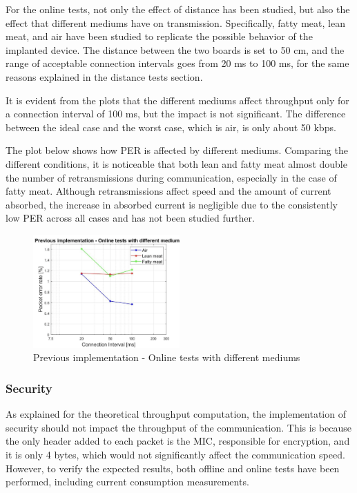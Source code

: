 \documentclass{Configuration_Files/PoliMi3i_thesis}
\begin{document}
For the online tests, not only the effect of distance has been studied, but also the effect that different mediums have on transmission. Specifically, fatty meat, lean meat, and air have been studied to replicate the possible behavior of the implanted device. The distance between the two boards is set to 50 cm, and the range of acceptable connection intervals goes from 20 ms to 100 ms, for the same reasons explained in the distance tests section.

It is evident from the plots that the different mediums affect throughput only for a connection interval of 100 ms, but the impact is not significant. The difference between the ideal case and the worst case, which is air, is only about 50 kbps.

The plot below shows how PER is affected by different mediums. Comparing the different conditions, it is noticeable that both lean and fatty meat almost double the number of retransmissions during communication, especially in the case of fatty meat. Although retransmissions affect speed and the amount of current absorbed, the increase in absorbed current is negligible due to the consistently low PER across all cases and has not been studied further.

\begin{figure}[H]
    \centering
    \includegraphics[width=0.5\textwidth]{Results Manuel/figure8}
    \caption{Previous implementation - Online tests with different mediums}
    \label{manuel_results_8}
\end{figure}

\subsubsection*{Security}

As explained for the theoretical throughput computation, the implementation of security should not impact the throughput of the communication. This is because the only header added to each packet is the MIC, responsible for encryption, and it is only 4 bytes, which would not significantly affect the communication speed. However, to verify the expected results, both offline and online tests have been performed, including current consumption measurements.
\end{document}
